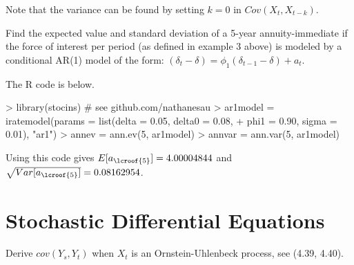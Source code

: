 \documentclass{article}
\numberwithin{questioncounter}{section}
\begin{document}
\begin{solution}
Note that the variance can be found by setting $k = 0$ in $Cov(X_{t}, X_{t-k})$.

\end{solution}

\begin{question}
Find the expected value and standard deviation of a 5-year annuity-immediate if the force of interest per period (as defined in example 3 above) is modeled by a conditional AR(1) model of the form: $(\delta_{t} - \delta) = \phi_{1} (\delta_{t-1} - \delta) + a_{t}$.
\end{question}

\begin{solution}
The R code is below.

\begin{Schunk}
\begin{Sinput}
> library(stocins) # see github.com/nathanesau
> ar1model = iratemodel(params = list(delta = 0.05, delta0 = 0.08,
+   phi1 = 0.90, sigma = 0.01), "ar1")
> annev = ann.ev(5, ar1model)
> annvar = ann.var(5, ar1model)
\end{Sinput}
\end{Schunk}

Using this code gives $E[a_{\lcroof{5}}] = 4.00004844$ and $\sqrt{Var[a_{\lcroof{5}}]} = 0.08162954$.

\end{solution}

\newpage
\setcounter{section}{3}
\section{Stochastic Differential Equations}

\begin{question}
Derive $cov(Y_{s}, Y_{t})$ when $X_{t}$ is an Ornstein-Uhlenbeck process, see (4.39, 4.40).
\end{question}
\end{document}
